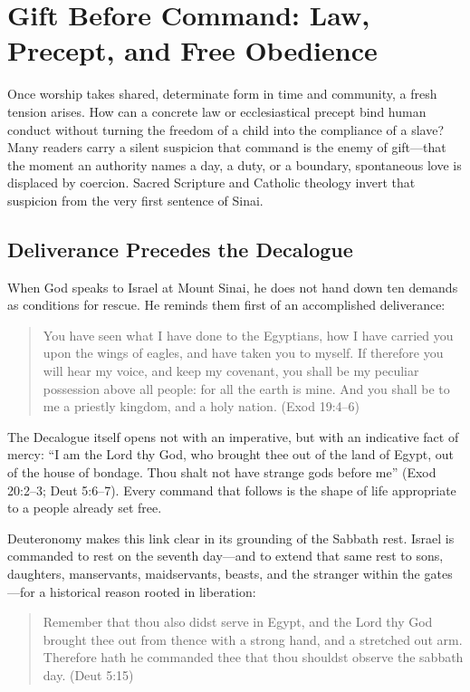 \section{Gift Before Command: Law, Precept, and Free Obedience}

Once worship takes shared, determinate form in time and community, a fresh tension arises. How can a concrete law or ecclesiastical precept bind human conduct without turning the freedom of a child into the compliance of a slave? Many readers carry a silent suspicion that command is the enemy of gift---that the moment an authority names a day, a duty, or a boundary, spontaneous love is displaced by coercion. Sacred Scripture and Catholic theology invert that suspicion from the very first sentence of Sinai.

\subsection{Deliverance Precedes the Decalogue}

When God speaks to Israel at Mount Sinai, he does not hand down ten demands as conditions for rescue. He reminds them first of an accomplished deliverance:

\begin{quote}
You have seen what I have done to the Egyptians, how I have carried you upon the wings of eagles, and have taken you to myself. If therefore you will hear my voice, and keep my covenant, you shall be my peculiar possession above all people: for all the earth is mine. And you shall be to me a priestly kingdom, and a holy nation. (Exod 19:4--6)
\end{quote}

The Decalogue itself opens not with an imperative, but with an indicative fact of mercy: ``I am the Lord thy God, who brought thee out of the land of Egypt, out of the house of bondage. Thou shalt not have strange gods before me'' (Exod 20:2--3; Deut 5:6--7). Every command that follows is the shape of life appropriate to a people already set free.

Deuteronomy makes this link clear in its grounding of the Sabbath rest. Israel is commanded to rest on the seventh day---and to extend that same rest to sons, daughters, manservants, maidservants, beasts, and the stranger within the gates---for a historical reason rooted in liberation:

\begin{quote}
Remember that thou also didst serve in Egypt, and the Lord thy God brought thee out from thence with a strong hand, and a stretched out arm. Therefore hath he commanded thee that thou shouldst observe the sabbath day. (Deut 5:15)
\end{quote}

